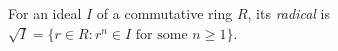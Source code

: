 
For an ideal $I$ of a commutative ring $R$, its \emph{radical} is $\sqrt I=\{r\in R:r^n\in I\text{ for some }n\ge1\}$.
